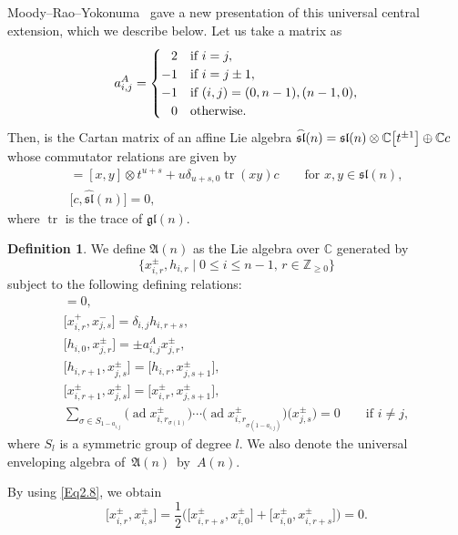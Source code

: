 \documentclass[10pt,a4paper]{amsart}
\numberwithin{equation}{section}
\theoremstyle{definition}
\newtheorem{Definition}[Theorem]{Definition}
\DeclareMathOperator{\tr}{tr}
\DeclareMathOperator{\ad}{ad}
\begin{document}
Moody--Rao--Yokonuma~\cite{MRY} gave a new presentation of this universal central extension, which we describe below.
Let us take a matrix  as
\begin{equation*}
a^A_{i,j}=\begin{cases}
\hphantom{-}2&\text{if }i=j,\\
-1&\text{if }i=j\pm1,\\
-1&\text{if }(i,j)=(0,n-1),(n-1,0),\\
\hphantom{-}0&\text{otherwise}.
\end{cases}
\end{equation*}
Then,  is the Cartan matrix of an affine Lie algebra $\smash{\widehat{\mathfrak{sl}}(n)}=\mathfrak{sl}(n)\otimes\mathbb{C}\bigl[t^{\pm1}\bigr]\oplus\mathbb{C}c$ whose commutator relations are given by
\begin{gather*}
[x\otimes t^u,y\otimes t^s]=[x,y]\otimes t^{u+s}+u\delta_{u+s,0}\tr(xy)c \qquad\text{for }x,y\in\mathfrak{sl}(n),\\
\bigl[c,\widehat{\mathfrak{sl}}(n)\bigr]=0,
\end{gather*}
where $\tr$ is the trace of $\mathfrak{gl}(n)$.
\begin{Definition}%
We define $\mathfrak{A}(n)$ as the Lie algebra over $\mathbb{C}$ generated by
\begin{equation*}
\bigl\{x_{i,r}^\pm, h_{i,r}\mid 0\leq i\leq n-1,\,r\in\mathbb{Z}_{\geq0}\bigr\}
\end{equation*}
subject to the following defining relations:
\begin{gather}
[h_{i,r}, h_{j,s}] = 0,\label{Eq2.1}\\
\bigl[x_{i,r}^{+}, x_{j,s}^{-}\bigr] = \delta_{i,j} h_{i, r+s},\label{Eq2.2}\\
\bigl[h_{i,0}, x_{j,r}^{\pm}\bigr] = \pm a^A_{i,j} x_{j,r}^{\pm},\label{Eq2.4}\\
\bigl[h_{i,r+1}, x_{j,s}^{\pm}\bigr] = \bigl[h_{i,r}, x_{j,s+1}^{\pm}\bigr],\label{Eq2.5}\\
\bigl[x_{i, r+1}^{\pm}, x_{j, s}^{\pm}\bigr] = \bigl[x_{i, r}^{\pm}, x_{j, s+1}^{\pm}\bigr],\label{Eq2.8}\\
\sum_{\sigma\in S_{1-a_{i,j}}}\limits\bigl(\ad x_{i,r_{\sigma(1)}}^{\pm}\bigr)\cdots\bigl(\ad x_{i,r_{\sigma(1-a_{i,j})}}^{\pm}\bigr)\bigl(x_{j,s}^{\pm}\bigr)= 0 \qquad\text{if }i \neq j,\label{Eq2.10}
\end{gather}
where $S_l$ is a symmetric group of degree $l$. We also denote the universal enveloping algebra of~$\mathfrak{A}(n)$~by~$A(n)$.
\end{Definition}
By using \eqref{Eq2.8}, we obtain
\begin{equation*}
\bigl[x^\pm_{i,r},x^\pm_{i,s}\bigr]=\frac{1}{2}\bigl(\bigl[x^\pm_{i,r+s},x^\pm_{i,0}\bigr]+\bigl[x^\pm_{i,0},x^\pm_{i,r+s}\bigr]\bigr)=0.%
\end{equation*}
\end{document}
